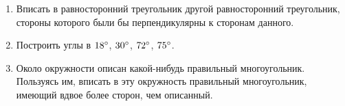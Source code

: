{\begin{enumerate}[noitemsep]
\item
Вписать в равносторонний треугольник другой равносторонний треугольник, стороны которого были бы перпендикулярны к сторонам данного.

\item
Построить углы в $18\degree$, $30\degree$, $72\degree$, $75\degree$.

\item
Около окружности описан какой-нибудь правильный многоугольник.
Пользуясь им, вписать в эту окружность правильный многоугольник, имеющий вдвое более сторон, чем описанный.

\end{enumerate}

}
